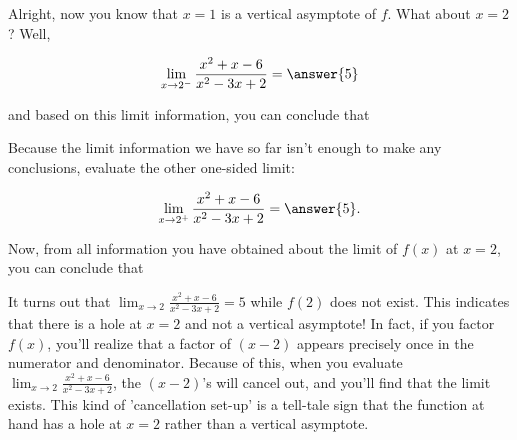 \documentclass[handout]{ximera}
\begin{document}
\begin{exercise}
\begin{exercise}
\begin{exercise}
Alright, now you know that $x=1$ is a vertical asymptote of $f$.  What about $x=2$?  Well, 

\[ \displaystyle\lim_{x \to 2^-} \frac{x^2+x-6}{x^2-3x+2} = \answer{5} \]

and based on this limit information, you can conclude that

\begin{multipleChoice}
\end{multipleChoice}

\begin{exercise}
Because the limit information we have so far isn't enough to make any conclusions, evaluate the other one-sided limit: 

\[ \displaystyle\lim_{x \to 2^+} \frac{x^2+x-6}{x^2-3x+2} = \answer{5}. \]

\begin{exercise}

Now, from all information you have obtained about the limit of $f(x)$ at $x=2$, you can conclude that 

\begin{multipleChoice}
    
    \begin{feedback}[correct]
    It turns out that $\displaystyle\lim_{x \to 2} \frac{x^2+x-6}{x^2-3x+2} = 5$ while $f(2)$ does not exist.  This indicates that there is a hole at $x=2$ and not a vertical asymptote!  In fact, if you factor $f(x)$, you'll realize that a factor of $(x-2)$ appears precisely once in the numerator and denominator.  Because of this, when you evaluate $\displaystyle\lim_{x \to 2} \frac{x^2+x-6}{x^2-3x+2}$, the $(x-2)$'s will cancel out, and you'll find that the limit exists.  This kind of 'cancellation set-up' is a tell-tale sign that the function at hand has a hole at $x=2$ rather than a vertical asymptote.  
    \end{feedback}
    
\end{multipleChoice}

\end{exercise}

\end{exercise}

\end{exercise}

\end{exercise}

\end{exercise}
\end{document}
